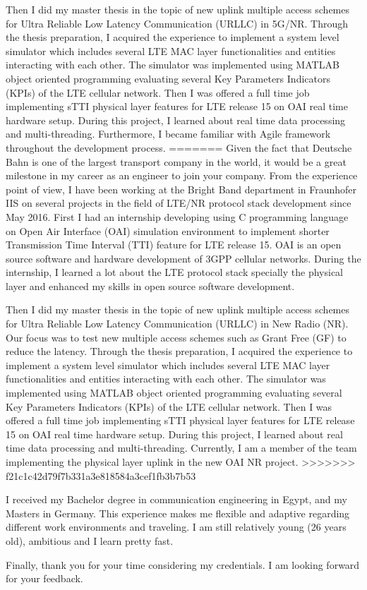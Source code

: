 \documentclass[11pt,a4paper,sans]{moderncv}        %
\begin{document}
Then I did my master thesis in the topic of new uplink multiple access schemes for Ultra Reliable Low Latency Communication (URLLC) in 5G/NR. Through the thesis preparation, I acquired the experience to implement a system level simulator which includes several LTE MAC layer functionalities and entities interacting with each other. The simulator was implemented using MATLAB object oriented programming evaluating several Key Parameters Indicators (KPIs) of the LTE cellular network. Then I was offered a full time job implementing sTTI physical layer features for LTE release 15 on OAI real time hardware setup. During this project, I learned about real time data processing and multi-threading. Furthermore, I became familiar with Agile framework throughout the development process. 
=======
Given the fact that Deutsche Bahn is one of the largest transport company in the world, it would be a great milestone in my career as an engineer to join your company. From the experience point of view, I have been working at the Bright Band department in Fraunhofer IIS on several projects in the field of LTE/NR protocol stack development since May 2016. First I had an internship developing using C programming language on Open Air Interface (OAI) simulation environment to implement shorter Transmission Time Interval (TTI) feature for LTE release 15. OAI is an open source software and hardware development of 3GPP cellular networks. During the internship, I learned a lot about the LTE protocol stack specially the physical layer and enhanced my skills in open source software development. 

Then I did my master thesis in the topic of new uplink multiple access schemes for Ultra Reliable Low Latency Communication (URLLC) in New Radio (NR). Our focus was to test new multiple access schemes such as Grant Free (GF) to reduce the latency. Through the thesis preparation, I acquired the experience to implement a system level simulator which includes several LTE MAC layer functionalities and entities interacting with each other. The simulator was implemented using MATLAB object oriented programming evaluating several Key Parameters Indicators (KPIs) of the LTE cellular network. Then I was offered a full time job implementing sTTI physical layer features for LTE release 15 on OAI real time hardware setup. During this project, I learned about real time data processing and multi-threading. Currently, I am a member of the team implementing the physical layer uplink in the new OAI NR project.  
>>>>>>> f21c1c42d79f7b331a3e818584a3cef1fb3b7b53

I received my Bachelor degree in communication engineering in Egypt, and my Masters in Germany. This experience makes me flexible and adaptive regarding different work environments and traveling. I am still relatively young (26 years old), ambitious and I learn pretty fast. 

Finally, thank you for your time considering my credentials. 
I am looking forward for your feedback.

\makeletterclosing
\end{document}
